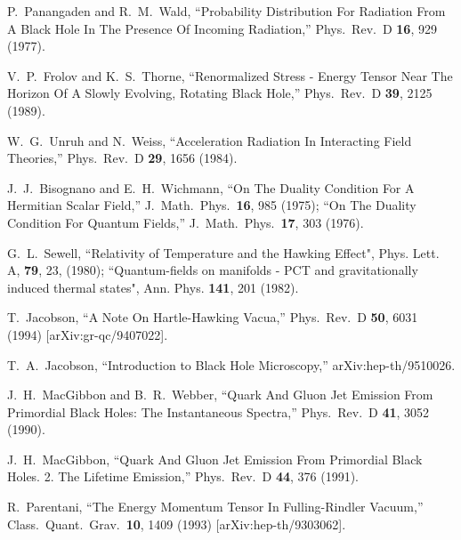 \documentclass[12pt]{article}
\begin{document}
\begin{thebibliography}{99}
P.~Panangaden and R.~M.~Wald,
``Probability Distribution For Radiation From A Black Hole In The Presence Of Incoming Radiation,''
Phys.\ Rev.\ D {\bf 16}, 929 (1977).

V.~P.~Frolov and K.~S.~Thorne,
``Renormalized Stress - Energy Tensor Near The Horizon Of A Slowly Evolving, Rotating Black Hole,''
Phys.\ Rev.\ D {\bf 39}, 2125 (1989).

W.~G.~Unruh and N.~Weiss,
``Acceleration Radiation In Interacting Field Theories,''
Phys.\ Rev.\ D {\bf 29}, 1656 (1984).

J.~J.~Bisognano and E.~H.~Wichmann,
``On The Duality Condition For A Hermitian Scalar Field,''
J.\ Math.\ Phys.\  {\bf 16}, 985 (1975);
``On The Duality Condition For Quantum Fields,''
J.\ Math.\ Phys.\  {\bf 17}, 303 (1976).

G.~L.~Sewell, ``Relativity of Temperature and the Hawking Effect", Phys. Lett. A, {\bf 79}, 23, (1980); ``Quantum-fields on manifolds - PCT and gravitationally induced thermal
states", Ann. Phys. {\bf 141}, 201 (1982).

T.~Jacobson,
``A Note On Hartle-Hawking Vacua,''
Phys.\ Rev.\ D {\bf 50}, 6031 (1994)
[arXiv:gr-qc/9407022].

T.~A.~Jacobson,
``Introduction to Black Hole Microscopy,''
arXiv:hep-th/9510026.

J.~H.~MacGibbon and B.~R.~Webber,
``Quark And Gluon Jet Emission From Primordial Black Holes: The Instantaneous Spectra,''
Phys.\ Rev.\ D {\bf 41}, 3052 (1990).

J.~H.~MacGibbon,
``Quark And Gluon Jet Emission From Primordial Black Holes. 2. The Lifetime Emission,''
Phys.\ Rev.\ D {\bf 44}, 376 (1991).

R.~Parentani,
``The Energy Momentum Tensor In Fulling-Rindler Vacuum,''
Class.\ Quant.\ Grav.\  {\bf 10}, 1409 (1993)
[arXiv:hep-th/9303062].


\end{thebibliography}
\end{document}
